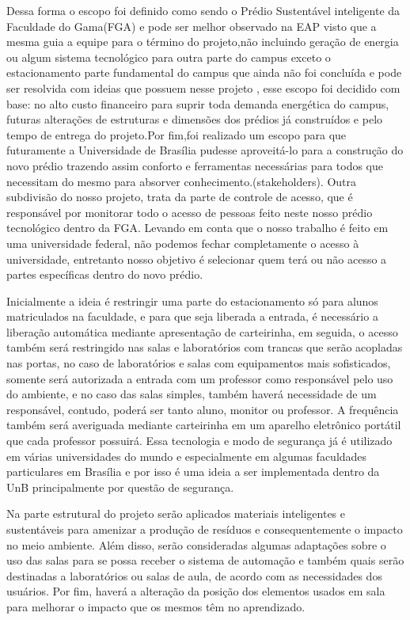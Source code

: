     Dessa forma o escopo foi definido como sendo o Prédio Sustentável inteligente da Faculdade do Gama(FGA) e pode ser melhor observado na EAP visto que a mesma guia a equipe para o término do projeto,não incluindo geração de energia ou algum sistema tecnológico para outra parte do campus exceto o estacionamento parte fundamental do campus que ainda não foi concluída e pode ser resolvida com ideias que possuem nesse projeto , esse escopo foi decidido com base: no  alto custo financeiro para suprir toda demanda energética do campus, futuras alterações de estruturas e dimensões dos prédios já construídos e pelo tempo de entrega do projeto.Por fim,foi realizado um escopo para que futuramente a Universidade de Brasília pudesse aproveitá-lo para a construção do novo prédio trazendo assim conforto e ferramentas necessárias para todos que necessitam do mesmo para absorver conhecimento.(stakeholders).
    Outra subdivisão do nosso projeto, trata da parte de controle de acesso, que é responsável por monitorar todo o acesso de pessoas feito neste nosso prédio tecnológico dentro da FGA. Levando em conta que o nosso trabalho é feito em uma universidade federal, não podemos fechar completamente o acesso à universidade, entretanto nosso objetivo é selecionar quem terá ou não acesso a partes específicas dentro do novo prédio.

Inicialmente a ideia é restringir uma parte do estacionamento só para alunos matriculados na faculdade, e para que seja liberada a entrada, é necessário a liberação automática mediante apresentação de carteirinha, em seguida, o acesso também será restringido nas salas e laboratórios com trancas que serão acopladas nas portas, no caso de laboratórios e salas com equipamentos mais sofisticados, somente será autorizada a entrada com um professor como responsável pelo uso do ambiente, e no caso das salas simples, também haverá necessidade de um responsável, contudo, poderá ser tanto aluno, monitor ou professor. A frequência também será averiguada mediante carteirinha em um aparelho eletrônico portátil que cada professor possuirá. Essa tecnologia e modo de segurança já é utilizado em várias universidades do mundo e especialmente em algumas faculdades particulares em Brasília e por isso é uma ideia a ser implementada dentro da UnB principalmente por questão de segurança.

Na parte estrutural do projeto serão aplicados materiais inteligentes e sustentáveis para amenizar a produção de resíduos e consequentemente o impacto no meio ambiente. Além disso, serão consideradas algumas adaptações sobre o uso das salas para se possa receber o sistema de automação e também quais serão destinadas a laboratórios ou salas de aula, de acordo com as necessidades dos usuários. Por fim, haverá a alteração da posição dos elementos usados em sala para melhorar o impacto que os mesmos têm no aprendizado.

